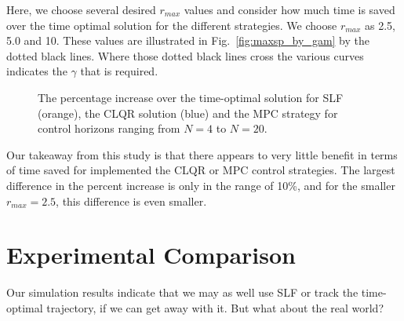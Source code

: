 \documentclass[journal,twocolumn,twoside]{IEEEtran}
\begin{document}
Here, we choose several desired $r_{max}$ values and consider how much time is saved over the time optimal solution for the different strategies. We choose $r_{max}$ as 2.5, 5.0 and 10. These values are illustrated in Fig.~\ref{fig:maxsp_by_gam} by the dotted black lines. Where those dotted black lines cross the various curves indicates the $\gamma$ that is required.

\begin{figure*}
  \begin{minipage}{0.45\textwidth}
    
  \end{minipage}
  \begin{minipage}{0.45\textwidth}
    
  \end{minipage}
  \caption{The percentage increase over the time-optimal solution for SLF (orange), the CLQR solution (blue) and the MPC strategy for control horizons ranging from $N=4$ to $N=20$. }
  \label{fig:perc_inc}
\end{figure*}
Our takeaway from this study is that there appears to very little benefit in terms of time saved for implemented the CLQR or MPC control strategies. The largest difference in the percent increase is only in the range of 10\%, and for the smaller $r_{max}=2.5$, this difference is even smaller. 

\section{Experimental Comparison}\label{sec:exp_comp}
Our simulation results indicate that we may as well use SLF or track the time-optimal trajectory, if we can get away with it. But what about the real world?



\begin{table*}
    
\end{table*}


\begin{table*}
    
\end{table*}
\end{document}
